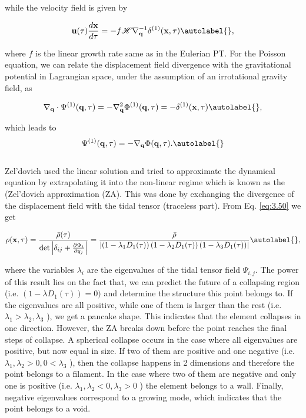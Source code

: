 while the velocity field is given by


\begin{equation}
    \mathbf{u}(\tau) \frac{d \mathbf{x}}{d \tau}=-f \mathcal{H} \nabla_{\mathbf{q}}^{-1} \delta^{(1)}(\mathbf{x}, \tau) \autolabel{},
\end{equation}


where $f$ is the linear growth rate same as in the Eulerian PT. For the Poisson equation, we can relate the displacement field divergence with the gravitational potential in Lagrangian space, under the assumption of an irrotational gravity field, as


\begin{equation}
    \nabla_{\mathbf{q}} \cdot \Psi^{(1)}(\mathbf{q}, \tau)=-\nabla_{\mathbf{q}}^{2} \Phi^{(1)}(\mathbf{q}, \tau)=-\delta^{(1)}(\mathbf{x}, \tau) \autolabel{},
\end{equation}


which leads to 
\begin{equation}
    \Psi^{(1)}(\mathbf{q}, \tau)=-\nabla_{\mathbf{q}} \Phi(\mathbf{q}, \tau).\autolabel{}
\end{equation} \\

Zel'dovich \cite{Zel1970A&A.....5...84Z} used the linear solution and tried to approximate the dynamical equation by extrapolating it into the non-linear regime which is known as the (Zel’dovich approximation (ZA). This was done by exchanging the divergence of the displacement field with the tidal tensor (traceless part). From Eq. \eqref{eq:3.50} we get


\begin{equation}
    \rho(\mathbf{x}, \tau)=\frac{\bar{\rho}(\tau)}{\operatorname{det}\left|\delta_{i j}+\frac{\partial \Psi_{i}}{\partial q_{j}}\right|}=\frac{\bar{\rho}}{\left|\left(1-\lambda_{1} D_{1}(\tau)\right)\left(1-\lambda_{2} D_{1}(\tau)\right)\left(1-\lambda_{3} D_{1}(\tau)\right)\right|} \autolabel{},
\end{equation}


where the variables $\lambda_{i}$ are the eigenvalues of the tidal tensor field $\Psi_{i, j}$. The power of this result lies on the fact that, we can predict the future of a collapsing region (i.e. $(1-\lambda D_{1}(\tau))=0)$ and determine the structure this point belongs to. If the eigenvalues are all positive, while one of them is larger than the rest (i.e. $\lambda_{1}>\lambda_{2}, \lambda_{3}$ ), we get a pancake shape. This indicates that the element collapses in one direction. However, the ZA breaks down before the point reaches the final steps of collapse. A spherical collapse occurs in the case where all eigenvalues are positive, but now equal in size. If two of them are positive and one negative (i.e. $\lambda_{1}, \lambda_{2}>0,0<\lambda_{3}$ ), then the collapse happens in 2 dimensions and therefore the point belongs to a filament. In the case where two of them are negative and only one is positive (i.e. $\lambda_{1}, \lambda_{2}<0, \lambda_{3}>0$ ) the element belongs to a wall. Finally, negative eigenvalues correspond to a growing mode, which indicates that the point belongs to a void.

